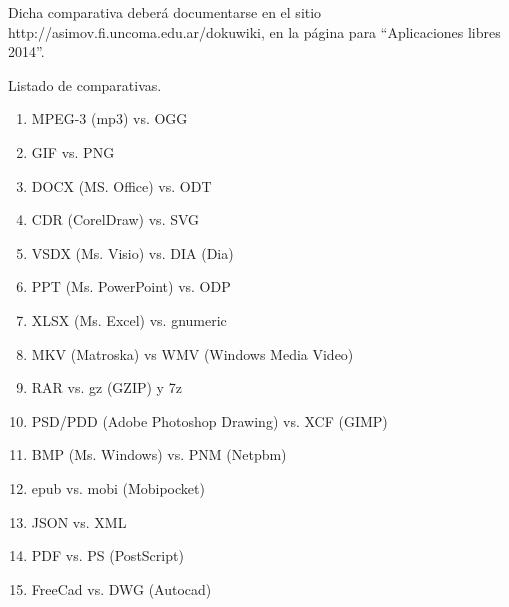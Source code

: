 \documentclass[12pt]{article}
\begin{document}
Dicha comparativa deberá documentarse en el sitio 
http://asimov.fi.uncoma.edu.ar/dokuwiki, en la página 
para ``Aplicaciones libres 2014''. 

Listado de comparativas. 
\begin{enumerate}
\item MPEG-3 (mp3) vs. OGG
\item GIF vs. PNG 
\item DOCX (MS. Office) vs. ODT
\item CDR (CorelDraw) vs. SVG 
\item VSDX (Ms. Visio) vs. DIA (Dia)
\item PPT (Ms. PowerPoint) vs. ODP 
\item XLSX (Ms. Excel) vs. gnumeric
\item MKV (Matroska) vs WMV (Windows Media Video)
\item RAR vs. gz (GZIP) y 7z
\item PSD/PDD (Adobe Photoshop Drawing) vs. XCF (GIMP)
\item BMP (Ms. Windows) vs. PNM (Netpbm)
\item epub vs. mobi (Mobipocket) 
\item JSON vs. XML 
\item PDF vs. PS (PostScript)
\item FreeCad vs. DWG (Autocad)
\end{enumerate}
 
\end{document}

